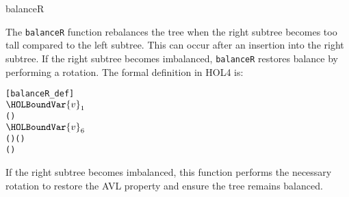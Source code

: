 \begin{defn}{balanceR}

The \texttt{balanceR} function rebalances the tree when the right subtree becomes too tall compared to the left subtree. This can occur after an insertion into the right subtree. If the right subtree becomes imbalanced, \texttt{balanceR} restores balance by performing a rotation. The formal definition in HOL4 is:
\begin{alltt}
	[balanceR_def]
	     \HOLTokenDefEquality{}
     \HOLSymConst{=}   \HOLSymConst{\ensuremath{+}}  
      
       \HOLTokenImp{}     
    \HOLTokenBar{}  \ensuremath{\HOLBoundVar{v}\sb{\mathrm{1}}}     \HOLTokenImp{}
         \HOLSymConst{\HOLTokenGt{}}   
          
           \HOLTokenImp{}    (    ) 
        \HOLTokenBar{}  \ensuremath{\HOLBoundVar{v}\sb{\mathrm{6}}}     \HOLTokenImp{}
             (    ) (    )
          (    ) 
       
\end{alltt}

If the right subtree becomes imbalanced, this function performs the necessary rotation to restore the AVL property and ensure the tree remains balanced.
\end{defn}

